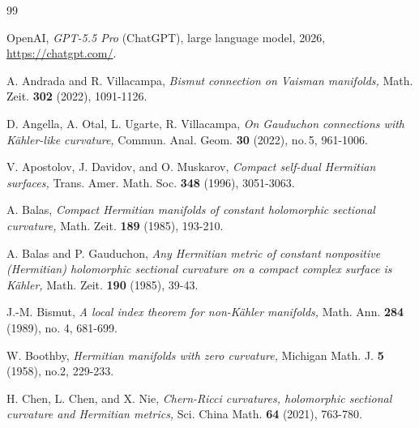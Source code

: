 \documentclass{amsart}
\begin{document}
\begin{thebibliography}{99}


 OpenAI, \emph{GPT-5.5 Pro} (ChatGPT), large language model, 2026, \url{https://chatgpt.com/}.

  A. Andrada and R. Villacampa, \emph{Bismut connection on Vaisman manifolds,} Math. Zeit. {\bf 302} (2022), 1091-1126.

  D. Angella, A. Otal, L. Ugarte, R. Villacampa,  \emph{On Gauduchon connections with K\"ahler-like curvature,}  Commun. Anal. Geom. \textbf{30} (2022), no.\,5, 961-1006.


 V. Apostolov, J. Davidov, and O. Muskarov, \emph{Compact self-dual Hermitian surfaces,} Trans. Amer. Math. Soc. {\bf 348} (1996),  3051-3063.

 A. Balas, \emph{Compact Hermitian manifolds of constant holomorphic sectional curvature, } Math. Zeit. {\bf 189} (1985),  193-210.

 A. Balas and P. Gauduchon, \emph{Any Hermitian metric of constant nonpositive (Hermitian) holomorphic sectional curvature on a compact complex surface is K\"ahler, } Math. Zeit. {\bf 190} (1985), 39-43.



 J.-M. Bismut, \emph{A local index theorem for non-K\"ahler manifolds,}  Math. Ann. {\bf 284} (1989), no. 4, 681-699.

 W. Boothby, \emph{Hermitian manifolds with zero curvature,} Michigan Math. J. {\bf 5} (1958), no.2, 229-233.

  H. Chen, L. Chen, and X. Nie, \emph{Chern-Ricci curvatures, holomorphic sectional curvature and  Hermitian metrics,}  Sci. China Math. {\bf 64} (2021), 763-780.



\end{thebibliography}
\end{document}
